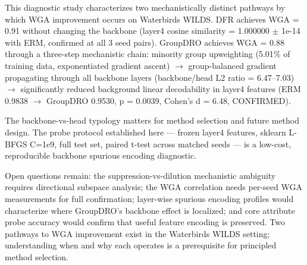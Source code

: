 
This diagnostic study characterizes two mechanistically distinct pathways by which WGA improvement occurs on Waterbirds WILDS. DFR achieves WGA = 0.91 without changing the backbone (layer4 cosine similarity = 1.000000 $\pm$ 1e-14 with ERM, confirmed at all 3 seed pairs). GroupDRO achieves WGA = 0.88 through a three-step mechanistic chain: minority group upweighting (5.01\% of training data, exponentiated gradient ascent) $\rightarrow$ group-balanced gradient propagating through all backbone layers (backbone/head L2 ratio = 6.47--7.03) $\rightarrow$ significantly reduced background linear decodability in layer4 features (ERM 0.9838 $\rightarrow$ GroupDRO 0.9530, p = 0.0039, Cohen's d = 6.48, CONFIRMED).

The backbone-vs-head typology matters for method selection and future method design. The probe protocol established here --- frozen layer4 features, sklearn L-BFGS C=1e9, full test set, paired t-test across matched seeds --- is a low-cost, reproducible backbone spurious encoding diagnostic.

Open questions remain: the suppression-vs-dilution mechanistic ambiguity requires directional subspace analysis; the WGA correlation needs per-seed WGA measurements for full confirmation; layer-wise spurious encoding profiles would characterize where GroupDRO's backbone effect is localized; and core attribute probe accuracy would confirm that useful feature encoding is preserved. Two pathways to WGA improvement exist in the Waterbirds WILDS setting; understanding when and why each operates is a prerequisite for principled method selection.

